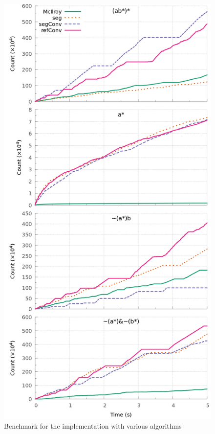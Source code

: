 \begin{figure}[!t]
  \centering
  \includegraphics[width=\linewidth]{measure/haskell_all.png}
  \caption{Benchmark for the \haskell implementation with various algorithms}
  \label{bench:haskell:all}
\end{figure}

